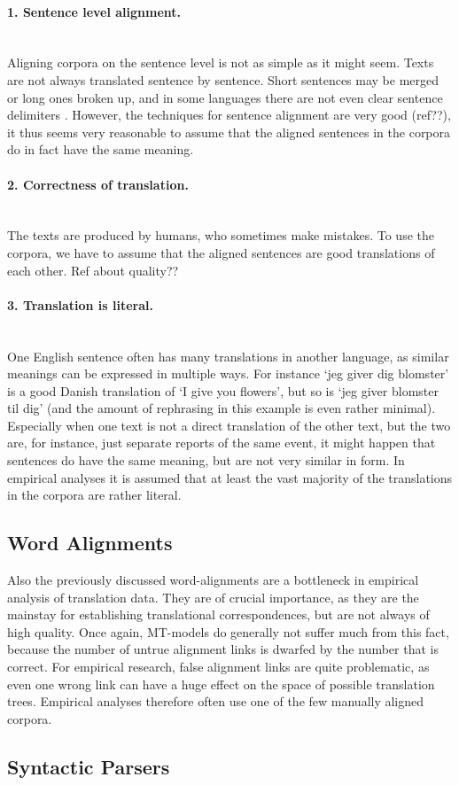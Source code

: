 \documentclass{report}
\newcommand{\myparagraph}[1]{\paragraph{#1}\mbox{}\\}
\theoremstyle{break}
\begin{document}
\myparagraph{1. Sentence level alignment.}
Aligning corpora on the sentence level is not as simple as it might seem. Texts are not always translated sentence by sentence. Short sentences may be merged or long ones broken up, and in some languages there are not even clear sentence delimiters \citep[p.55]{koehn2008statistical}. However, the techniques for sentence alignment are very good (ref??), it thus seems very reasonable to assume that the aligned sentences in the corpora do in fact have the same meaning.

\myparagraph{2. Correctness of translation. }
The texts are produced by humans, who sometimes make mistakes. To use the corpora, we have to assume that the aligned sentences are good translations of each other. Ref about quality??

\myparagraph{3. Translation is literal.}
One English sentence often has many translations in another language, as similar meanings can be expressed in multiple ways. For instance `jeg giver dig blomster' is a good Danish translation of `I give you flowers', but so is `jeg giver blomster til dig' (and the amount of rephrasing in this example is even rather minimal). Especially when one text is not a direct translation of the other text, but the two are, for instance, just separate reports of the same event, it might happen that sentences do have the same meaning, but are not very similar in form. In empirical analyses it is assumed that at least the vast majority of the translations in the corpora are rather literal.
 
\subsection{Word Alignments}

Also the previously discussed word-alignments are a bottleneck in empirical analysis of translation data. They are of crucial importance, as they are the mainstay for establishing translational correspondences, but are not always of high quality. Once again, MT-models do generally not suffer much from this fact, because the number of untrue alignment links is dwarfed by the number that is correct. For empirical research, false alignment links are quite problematic, as even one wrong link can have a huge effect on the space of possible translation trees. Empirical analyses therefore often use one of the few manually aligned corpora.

\subsection{Syntactic Parsers}
\end{document}
